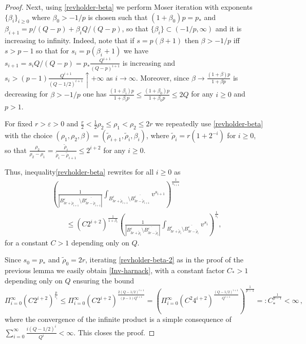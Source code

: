 \documentclass[10pt]{amsart}
\numberwithin{equation}{section}
\theoremstyle{definition}
\begin{document}
\begin{proof}
Next, using \eqref{revholder-beta} we perform Moser iteration with exponents $\{ \beta_i\}_{i \geq 0}$ where $\beta_0>-1/p$ is chosen such that $(1+\beta_0)p=p_*$ and $\beta_{i+1}=p/(Q-p)+\beta_i Q/(Q-p)$, so that $\{\beta_i\} \subset (-1/p, \infty)$ and it is increasing to infinity. Indeed, note that if $s=p (\beta+1)$ then $\beta >-1/p$ iff $s> p-1$ so that for $s_i=p(\beta_i+1)$ we have $s_{i+1}=s_i Q/(Q-p)=p_* \frac{Q^{i+1}}{(Q-p)^{i+1}}$ is increasing and  $s_i > (p-1)  \frac{Q^{i+1}}{(Q-1/2)^{i+1}} \uparrow +\infty$ as $i \to \infty$.   Moreover, since $\beta \to \frac{(1+\beta)p}{1+\beta p} $ is decreasing for $\beta > -1/p$ one has $\frac{(1+\beta_i)p}{1+\beta_i p}  \leq \frac{(1+\beta_0)p}{1+\beta _0 p}\leq 2Q $ for any $i \geq 0$ and $p>1$. 

For fixed $r>\varepsilon >0$ and $\frac{r}2< \frac12 \rho_2 \leq  \rho_1<\rho_2  \leq  2r $ we repeatedly use \eqref{revholder-beta} with the choice $(\rho_1,\rho_2,\beta)=(\tilde{\rho}_{i+1}, \tilde{\rho}_i,\beta_i)$, where $\tilde{\rho}_i=r(1+2^{-i})$ for $i \geq 0$, so that $\frac{\rho_2}{\rho_2-\rho_1} = \frac{\tilde{\rho}_i}{\tilde{\rho}_i - \tilde{\rho}_{i+1}} \leq 2^{i+2}$ for any $i \geq 0$.

Thus, inequality\eqref{revholder-beta} rewrites for all $i\geq 0$ as
\begin{equation}
\label{revholder-beta-2}
\begin{aligned}
&\left( \frac{1}{ |B^\varepsilon_{3r+\tilde{\rho}_{i+1}} \setminus \overline{B^\varepsilon_{3r-\tilde{\rho}_{i+1}}}|}\int_{  B^\varepsilon_{3r+\tilde{\rho}_{i+1}} \setminus \overline{B^\varepsilon_{3r-\tilde{\rho}_{i+1}}}}  v^{s_{i+1}}   \right)^{\frac{1}{s_{i+1}}} \\ 
 & \quad \quad\leq \left(   
 C  2^{i+2} \right)^{\frac{1}{1+\beta_i}}   \left( \frac{1}{ |B^\varepsilon_{3r+\tilde{\rho}_i} \setminus \overline{B^\varepsilon_{3r-\tilde{\rho}_i}}|}\int_{  B^\varepsilon_{3r+\tilde{\rho}_i} \setminus \overline{B^\varepsilon_{3r-\tilde{\rho}_i}}}  v^{s_i}   \right)^{\frac{1}{s_i}},
 \end{aligned}
\end{equation}
for a constant $C>1$ depending only on $Q$.

Since $s_0=p_*$ and $\tilde{\rho}_0=2r$, iterating \eqref{revholder-beta-2} as in the proof of the previous lemma  we easily obtain \eqref{Inv-harnack},
 with a constant factor $C_*>1$ depending only on $Q$ ensuring the bound 
 \[ \Pi_{i=0}^\infty  \left(   
 C  2^{i+2} \right)^{\frac{p}{s_i}} \leq \Pi_{i=0}^\infty  \left(   
 C  2^{i+2} \right)^{\frac{2 (Q-1/2)^{i+1}}{(p-1) Q^{i+1}}}= \left( \Pi_{i=0}^\infty  \left(   
 C^2  4^{i+2} \right)^{\frac{ (Q-1/2)^{i+1}}{ Q^{i+1}}} \right)^{\frac{1}{p-1}}=:C_*^{\frac{1}{p-1}} 
 <\infty \, , \] 
 where the convergence of the infinite product is a simple consequence of  $\sum_{i=0}^\infty  \frac{i (Q-1/2)^i}{ Q^i} <\infty$. This closes the proof.
\end{proof}
\end{document}
